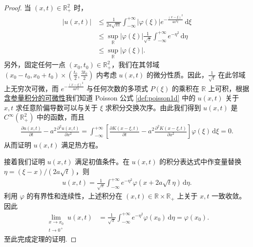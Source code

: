 \documentclass[../../main.tex]{subfiles}%
\begin{document}
\begin{proof}
当 $(x,t)\in\mathbb{R}_+^2$ 时，
\begin{align*}
|u(x,t)|&\leqslant \frac{1}{2a\sqrt{\pi t}}\int_{-\infty}^{+\infty}|\varphi(\xi)|e^{-\frac{(x-\xi)^2}{4a^2t}}\,\mathrm{d}\xi \\
&\leqslant \sup_{\mathbb{R}}|\varphi(\xi)|\frac{1}{\sqrt{\pi}}\int_{-\infty}^{+\infty}e^{-\eta^2}\,\mathrm{d}\eta \\
&\leqslant \sup_{\mathbb{R}}|\varphi(\xi)|.
\end{align*}
另外，固定任何一点 $(x_0,t_0)\in\mathbb{R}_+^2$，我们在其邻域 $(x_0-t_0,x_0+t_0)\times(\frac{t_0}{2},\frac{3t_0}{2})$ 内考虑 $u(x,t)$ 的微分性质。因此，$\frac{1}{\sqrt{t}}$ 在此邻域上无穷次可微，而 $e^{-\frac{(x-\xi)^2}{4a^2t}}$ 与任何次数的多项式 $P(\xi)$ 的乘积在 $\mathbb{R}$ 上可积，根据\hyperref[Basis of Analytics-theorem:含参量积分的可微性1]{含参量积分的可微性}我们知道 Poisson 公式 \eqref{def:poisson1d} 中的 $u(x,t)$ 关于 $x,t$ 求任意阶偏导数可以与关于 $\xi$ 求积分交换次序。由此我们得到 $u(x,t)$ 是 $C^\infty(\mathbb{R}_+^2)$ 中的函数，而且
\begin{align*}
\frac{\partial u(x,t)}{\partial t}-a^2\frac{\partial^2 u(x,t)}{\partial x^2}
=\int_{-\infty}^{+\infty}\left[\frac{\partial K(x-\xi,t)}{\partial t}-a^2\frac{\partial^2 K(x-\xi,t)}{\partial x^2}\right]\varphi(\xi)\,\mathrm{d}\xi=0.
\end{align*}
从而证明 $u(x,t)$ 满足热方程。

接着我们证明 $u(x,t)$ 满足初值条件。在 $u(x,t)$ 的积分表达式中作变量替换 $\eta=(\xi-x)/(2a\sqrt{t})$，则
\begin{align*}
u(x,t)=\frac{1}{\sqrt{\pi}}\int_{-\infty}^{+\infty}e^{-\eta^2}\varphi(x+2a\sqrt{t}\eta)\,\mathrm{d}\eta.
\end{align*}
利用 $\varphi$ 的有界性和连续性，上述积分在 $(x,t)\in\mathbb{R}\times\mathbb{R}_+$ 上关于 $x,t$ 一致收敛。因此
\begin{align*}
\lim_{\substack{x\to x_0\\ t\to 0^+}}u(x,t)
&=\frac{1}{\sqrt{\pi}}\int_{-\infty}^{+\infty}e^{-\eta^2}\varphi(x_0)\,\mathrm{d}\eta=\varphi(x_0).
\end{align*}
至此完成定理的证明.
\end{proof}
\end{document}
